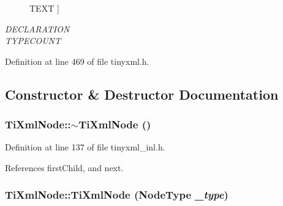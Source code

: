 \begin{Desc}
\begin{description}
{{TEXT}
\label{class_ti_xml_node_a836eded4920ab9e9ef28496f48cd95a2a672617f36c5606a966ac378e6ddc0fd8}
}]\item[{\em 
\hypertarget{class_ti_xml_node_a836eded4920ab9e9ef28496f48cd95a2ac02445686c2b72d11385002b3466c28b}{
DECLARATION}
\label{class_ti_xml_node_a836eded4920ab9e9ef28496f48cd95a2ac02445686c2b72d11385002b3466c28b}
}]\item[{\em 
\hypertarget{class_ti_xml_node_a836eded4920ab9e9ef28496f48cd95a2a8334037fb3fe05c67d6110975b38a8bf}{
TYPECOUNT}
\label{class_ti_xml_node_a836eded4920ab9e9ef28496f48cd95a2a8334037fb3fe05c67d6110975b38a8bf}
}]\end{description}
\end{Desc}



Definition at line 469 of file tinyxml.h.

\subsection{Constructor \& Destructor Documentation}
\hypertarget{class_ti_xml_node_a027a76cccd359c831ee4024b58c49625}{
\subsubsection[{$\sim$TiXmlNode}]{\setlength{\rightskip}{0pt plus 5cm}TiXmlNode::$\sim$TiXmlNode ()}}
\label{class_ti_xml_node_a027a76cccd359c831ee4024b58c49625}


Definition at line 137 of file tinyxml\_\-inl.h.

References firstChild, and next.\hypertarget{class_ti_xml_node_a3f46721695868667113c7487ff123f20}{
\subsubsection[{TiXmlNode}]{\setlength{\rightskip}{0pt plus 5cm}TiXmlNode::TiXmlNode ({\bf NodeType} {\em \_\-type})}}
\label{class_ti_xml_node_a3f46721695868667113c7487ff123f20}


